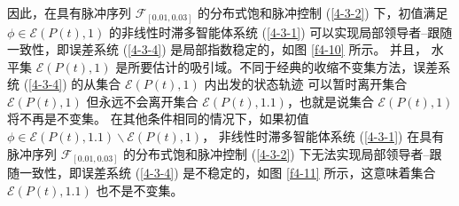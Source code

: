 因此，在具有脉冲序列 $\mathscr{F}_{[0.01,0.03]}$ 的分布式饱和脉冲控制 (\ref{4-3-2}) 下，初值满足 $\phi\in\mathscr{E}( P(t),1)$ 的非线性时滞多智能体系统 (\ref{4-3-1}) 可以实现局部领导者--跟随一致性，即误差系统 (\ref{4-3-4}) 是局部指数稳定的，如图 \ref{f4-10} 所示。 并且， 水平集  $\mathscr{E}( P(t),1)$ 是所要估计的吸引域。不同于经典的收缩不变集方法，误差系统 (\ref{4-3-4}) 的从集合 $\mathscr{E}( P(t),1)$ 内出发的状态轨迹 可以暂时离开集合 $\mathscr{E}( P(t) ,1)$ 但永远不会离开集合 $\mathscr{E}( P(t),1.1)$，也就是说集合  $\mathscr{E}( P(t) ,1)$ 将不再是不变集。 在其他条件相同的情况下，如果初值 $\phi\in\mathscr{E}( P(t),1.1)\backslash\mathscr{E}( P(t),1)$， 非线性时滞多智能体系统 (\ref{4-3-1}) 在具有脉冲序列 $\mathscr{F}_{[0.01,0.03]}$ 的分布式饱和脉冲控制 (\ref{4-3-2}) 下无法实现局部领导者--跟随一致性，即误差系统 (\ref{4-3-4}) 是不稳定的，如图 \ref{f4-11} 所示，这意味着集合 $\mathscr{E}( P(t),1.1)$ 也不是不变集。

